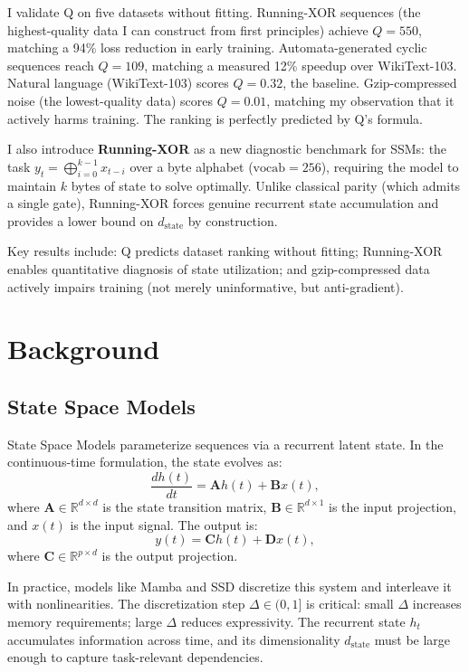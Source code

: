 \documentclass{article}
\begin{document}
I validate Q on five datasets without fitting. Running-XOR sequences (the highest-quality data I can construct from first principles) achieve $Q = 550$, matching a 94\% loss reduction in early training. Automata-generated cyclic sequences reach $Q = 109$, matching a measured 12\% speedup over WikiText-103. Natural language (WikiText-103) scores $Q = 0.32$, the baseline. Gzip-compressed noise (the lowest-quality data) scores $Q = 0.01$, matching my observation that it actively harms training. The ranking is perfectly predicted by Q's formula.

I also introduce \textbf{Running-XOR} as a new diagnostic benchmark for SSMs: the task $y_t = \bigoplus_{i=0}^{k-1} x_{t-i}$ over a byte alphabet ($\mathrm{vocab} = 256$), requiring the model to maintain $k$ bytes of state to solve optimally. Unlike classical parity (which admits a single gate), Running-XOR forces genuine recurrent state accumulation and provides a lower bound on $d_{\mathrm{state}}$ by construction.

Key results include: Q predicts dataset ranking without fitting; Running-XOR enables quantitative diagnosis of state utilization; and gzip-compressed data actively impairs training (not merely uninformative, but anti-gradient).

\section{Background}

\subsection{State Space Models}

State Space Models parameterize sequences via a recurrent latent state. In the continuous-time formulation, the state evolves as:
\begin{equation}
  \frac{dh(t)}{dt} = \mathbf{A} h(t) + \mathbf{B} x(t),
\end{equation}
where $\mathbf{A} \in \mathbb{R}^{d \times d}$ is the state transition matrix, $\mathbf{B} \in \mathbb{R}^{d \times 1}$ is the input projection, and $x(t)$ is the input signal. The output is:
\begin{equation}
  y(t) = \mathbf{C} h(t) + \mathbf{D} x(t),
\end{equation}
where $\mathbf{C} \in \mathbb{R}^{p \times d}$ is the output projection.

In practice, models like Mamba \citep{gu2024mamba} and SSD \citep{ssd2024} discretize this system and interleave it with nonlinearities. The discretization step $\Delta \in (0, 1]$ is critical: small $\Delta$ increases memory requirements; large $\Delta$ reduces expressivity. The recurrent state $h_t$ accumulates information across time, and its dimensionality $d_{\mathrm{state}}$ must be large enough to capture task-relevant dependencies.
\end{document}

